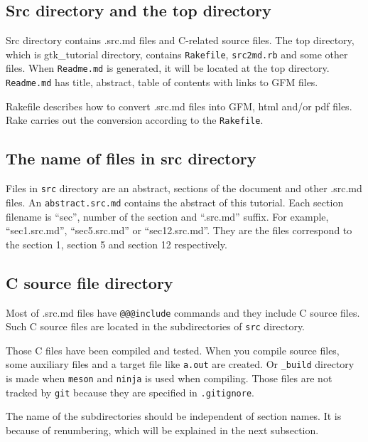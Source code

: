 \subsection{Src directory and the top
directory}\label{src-directory-and-the-top-directory}

Src directory contains .src.md files and C-related source files. The top
directory, which is gtk\_tutorial directory, contains \texttt{Rakefile},
\texttt{src2md.rb} and some other files. When \texttt{Readme.md} is
generated, it will be located at the top directory. \texttt{Readme.md}
has title, abstract, table of contents with links to GFM files.

Rakefile describes how to convert .src.md files into GFM, html and/or
pdf files. Rake carries out the conversion according to the
\texttt{Rakefile}.

\subsection{The name of files in src
directory}\label{the-name-of-files-in-src-directory}

Files in \texttt{src} directory are an abstract, sections of the
document and other .src.md files. An \texttt{abstract.src.md} contains
the abstract of this tutorial. Each section filename is ``sec'', number
of the section and ``.src.md'' suffix. For example, ``sec1.src.md'',
``sec5.src.md'' or ``sec12.src.md''. They are the files correspond to
the section 1, section 5 and section 12 respectively.

\subsection{C source file directory}\label{c-source-file-directory}

Most of .src.md files have \texttt{@@@include} commands and they include
C source files. Such C source files are located in the subdirectories of
\texttt{src} directory.

Those C files have been compiled and tested. When you compile source
files, some auxiliary files and a target file like \texttt{a.out} are
created. Or \texttt{\_build} directory is made when \texttt{meson} and
\texttt{ninja} is used when compiling. Those files are not tracked by
\texttt{git} because they are specified in \texttt{.gitignore}.

The name of the subdirectories should be independent of section names.
It is because of renumbering, which will be explained in the next
subsection.

